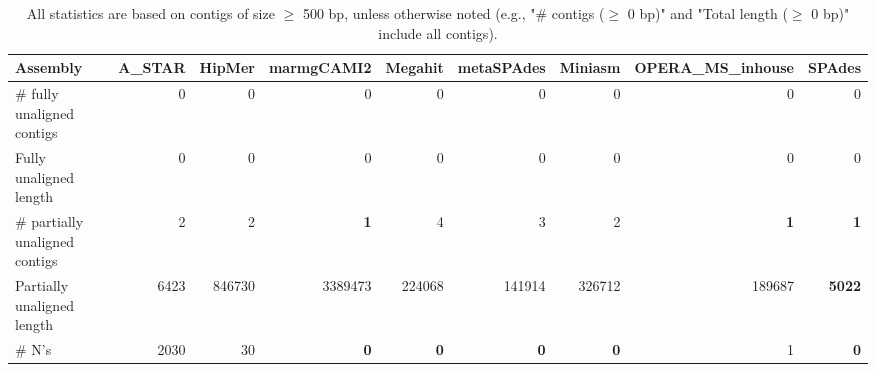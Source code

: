 \documentclass[12pt,a4paper]{article}
\begin{document}
\begin{table}[ht]
\begin{center}
\caption{All statistics are based on contigs of size $\geq$ 500 bp, unless otherwise noted (e.g., "\# contigs ($\geq$ 0 bp)" and "Total length ($\geq$ 0 bp)" include all contigs).}
\begin{tabular}{|l*{8}{|r}|}
\hline
Assembly & A\_STAR & HipMer & marmgCAMI2 & Megahit & metaSPAdes & Miniasm & OPERA\_MS\_inhouse & SPAdes \\ \hline
\# fully unaligned contigs & 0 & 0 & 0 & 0 & 0 & 0 & 0 & 0 \\ \hline
Fully unaligned length & 0 & 0 & 0 & 0 & 0 & 0 & 0 & 0 \\ \hline
\# partially unaligned contigs & 2 & 2 & {\bf 1} & 4 & 3 & 2 & {\bf 1} & {\bf 1} \\ \hline
Partially unaligned length & 6423 & 846730 & 3389473 & 224068 & 141914 & 326712 & 189687 & {\bf 5022} \\ \hline
\# N's & 2030 & 30 & {\bf 0} & {\bf 0} & {\bf 0} & {\bf 0} & 1 & {\bf 0} \\ \hline
\end{tabular}
\end{center}
\end{table}
\end{document}
